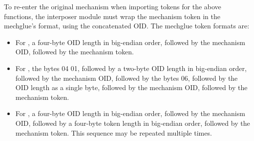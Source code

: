 \documentclass[letterpaper,10pt,english]{sphinxmanual}
\begin{document}
%
\begin{sphinxVerbatim}[commandchars=\\\{\}]
  
       
     

  
       
       

  
       
     
\end{sphinxVerbatim}

To re-enter the original mechanism when importing tokens for the above
functions, the interposer module must wrap the mechanism token in the
mechglue’s format, using the concatenated OID.  The mechglue token
formats are:
\begin{itemize}
\item {} 
For , a four-byte OID length in big-endian
order, followed by the mechanism OID, followed by the mechanism
token.

\item {} 
For , the bytes 04 01, followed by a two-byte OID
length in big-endian order, followed by the mechanism OID, followed
by the bytes 06, followed by the OID length as a single byte,
followed by the mechanism OID, followed by the mechanism token.

\item {} 
For , a four-byte OID length in big-endian order,
followed by the mechanism OID, followed by a four-byte token length
in big-endian order, followed by the mechanism token.  This sequence
may be repeated multiple times.

\end{itemize}
\end{document}

